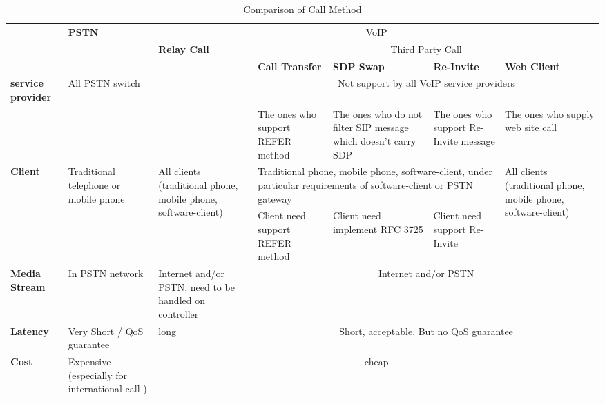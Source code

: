 \begin{table}[!hbtp]
\centering
\begin{tabular}{|p{0.60in}|p{0.60in}|p{0.65in}|p{0.65in}|p{0.65in}|p{0.65in}|p{0.65in}|}
\hline
        & \multirow{3}{0.65in}{\textbf{PSTN}} &\multicolumn{5}{c|}{VoIP} \\ \cline{3-7}
        &               & \multirow{3}{0.65in}{\textbf{Relay Call}} &\multicolumn{4}{c|}{Third Party Call} \\ \cline{4-7}
 		  &               &                    & \textbf{Call Transfer} &\textbf{SDP Swap} &\textbf{Re-Invite} &\textbf{Web Client} \\\cline{1-7}	
\textbf{service provider} & All PSTN switch & \multirow{2}{0.65in}{support by all VoIP service providers} & \multicolumn{4}{c|}{Not support by all VoIP service providers}\\ \cline{4-7}
& & & The ones who support REFER method & The ones who do not filter SIP message which doesn't carry SDP & The ones who support
Re-Invite message & The ones who supply web site call \\ \cline{1-7}

\textbf{Client} & \multirow{2}{0.65in}{Traditional telephone or mobile phone} &\multirow{2}{0.65in}{All clients (traditional phone, mobile phone, software-client)} & \multicolumn{3}{p{1.95in}|}{Traditional phone, mobile phone, software-client, under particular requirements of software-client or PSTN gateway} & \multirow{2}{0.65in}{All clients (traditional phone, mobile phone, software-client)} \\ \cline{4-6}
& & & Client need support REFER method  & Client need implement RFC 3725 & Client need support Re-Invite & \\ \cline{1-7}
\textbf{Media Stream} & In PSTN network & Internet and/or PSTN, need to be handled on controller & \multicolumn{4}{c|}{Internet and/or PSTN}\\ \cline{1-7}
\textbf{Latency} & Very Short / QoS guarantee & long & \multicolumn{4}{c|}{Short, acceptable. But no QoS guarantee} \\ \cline{1-7}
\textbf{Cost} & Expensive (especially for international call ) & \multicolumn{5}{c|}{cheap} \\
\hline
\end{tabular}
\caption{Comparison of Call Method}
\label{table:ComparisonOfCallMethod}
\end{table}

